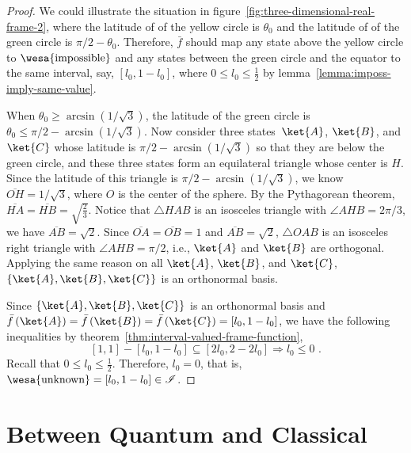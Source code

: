 \documentclass[12pt]{iopart}
\theoremstyle{plain}
\theoremstyle{definition}
\theoremstyle{remark}
\newcommand{\imposs}{{\mbox{\wesa{impossible}}}}
\newcommand{\unknown}{{\mbox{\wesa{unknown}}}}
\begin{document}
\begin{proof}
We could illustrate the situation in figure~\ref{fig:three-dimensional-real-frame-2},
where the latitude of of the yellow circle is $\theta_{0}$ and the
latitude of of the green circle is $\pi / 2-\theta_{0}$. Therefore,
$\bar{f}$ should map any state above the yellow circle to $\imposs$
and any states between the green circle and the equator to the same
interval, say, $\left[l_{0},1-l_{0}\right]$, where $0\le l_{0}\le\frac{1}{2}$
by lemma~\ref{lemma:imposs-imply-same-value}.

When $\theta_{0}\ge\arcsin\left(1 / \sqrt{3}\right)$, the latitude
of the green circle is $\theta_{0}\le\pi / 2-\arcsin\left(1 / \sqrt{3}\right)$.
Now consider three states~$\ket{A}$, $\ket{B}$, and $\ket{C}$
whose latitude is $\pi / 2-\arcsin\left(1 / \sqrt{3}\right)$
so that they are below the green circle, and these three states form
an equilateral triangle whose center is $H$. Since the latitude of
this triangle is $\pi / 2-\arcsin\left(1 / \sqrt{3}\right)$,
we know $\overline{OH}=1 / \sqrt{3}$, where $O$ is the center
of the sphere. By the Pythagorean theorem, $\overline{HA}=\overline{HB}=\sqrt{\frac{2}{3}}$.
Notice that $\triangle HAB$ is an isosceles triangle with $\angle AHB=2\pi / 3$,
we have $\overline{AB}=\sqrt{2}$. Since $\overline{OA}=\overline{OB}=1$
and $\overline{AB}=\sqrt{2}$, $\triangle OAB$ is an isosceles right
triangle with $\angle AHB=\pi / 2$, i.e., $\ket{A}$ and $\ket{B}$
are orthogonal. Applying the same reason on all $\ket{A}$, $\ket{B}$,
and $\ket{C}$, $\left\{ \ket{A},\ket{B},\ket{C}\right\} $ is an
orthonormal basis.

Since $\left\{ \ket{A},\ket{B},\ket{C}\right\} $ is an orthonormal
basis and $\bar{f}\left(\ket{A}\right)=\bar{f}\left(\ket{B}\right)=\bar{f}\left(\ket{C}\right)=\left[l_{0},1-l_{0}\right]$,
we have the following inequalities by theorem~\ref{thm:interval-valued-frame-function},
\begin{equation}
\left[1,1\right]-\left[l_{0},1-l_{0}\right]\subseteq\left[2l_{0},2-2l_{0}\right]\Rightarrow l_{0}\le0\textrm{ .}
\end{equation}
Recall that $0\le l_{0}\le\frac{1}{2}$. Therefore, $l_{0}=0$, that
is, $\unknown=\left[l_{0},1-l_{0}\right]\in\mathscr{I}$. \end{proof}

\section{Between Quantum and Classical}
\end{document}
